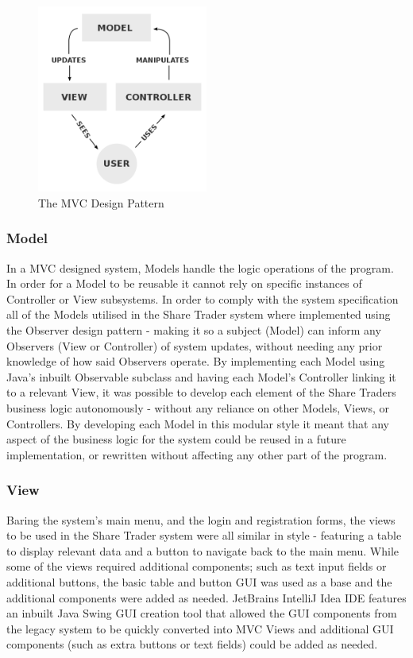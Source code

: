 \documentclass[12pt, a4paper,titlepage]{article}
\begin{document}
\begin{figure}[h]
    \begin{center}
        \includegraphics[width = 0.5\textwidth]{./res/mvc.png}
        \caption[The MVC Design Pattern]{The MVC Design Pattern 
        \footnotemark} 
    \end{center}
\end{figure}

\subsubsection{Model}
In a MVC designed system, Models handle the logic operations of the program.
In order for a Model to be reusable it cannot rely on specific instances of
Controller or View subsystems. 
In order to comply with the system specification all of the Models utilised in
the Share Trader system where implemented using the Observer design pattern -
making it so a subject (Model) can inform any Observers (View or Controller)
of system updates, without needing any prior knowledge of how said Observers
operate.  
By implementing each Model using Java’s inbuilt Observable subclass and having
each Model’s Controller linking it to a relevant View, it was possible to
develop each element of the Share Traders business logic autonomously -
without any reliance on other Models, Views, or Controllers.
By developing each Model in this modular style it meant that any aspect of the
business logic for the system could be reused in a future implementation, or
rewritten without affecting any other part of the program.

\subsubsection{View}
Baring the system's main menu, and the login and registration forms, the views
to be used in the Share Trader system were all similar in style - featuring a
table to display relevant data and a button to navigate back to the main menu.
While some of the views required additional components; such as text input
fields or additional buttons, the basic table and button GUI was used as a
base and the additional components were added as needed.  
JetBrains IntelliJ Idea IDE features an inbuilt Java Swing GUI creation tool
that allowed the GUI components from the legacy system to be quickly converted
into MVC Views and additional GUI components (such as extra buttons or text
fields) could be added as needed.
\end{document}
